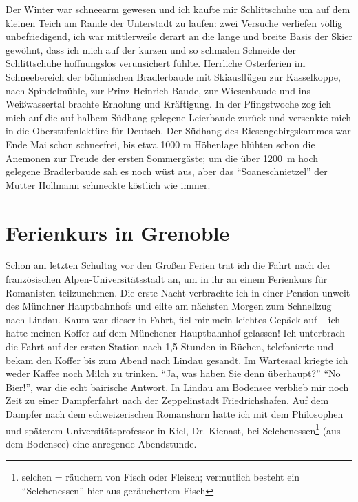 \documentclass[a5paper,pagesize,10pt,twoside=true]{scrbook}
\begin{document}
Der Winter war schneearm gewesen und ich kaufte mir Schlittschuhe um auf dem kleinen Teich am Rande der Unterstadt zu laufen: zwei Versuche verliefen völlig unbefriedigend, ich war mittlerweile derart an die lange und breite Basis der Skier gewöhnt, dass ich mich auf der kurzen und so schmalen Schneide der Schlittschuhe hoffnungslos verunsichert fühlte. Herrliche Osterferien im Schneebereich der böhmischen Bradlerbaude mit Skiausflügen zur Kasselkoppe, nach Spindelmühle, zur Prinz-Heinrich-Baude, zur Wiesenbaude und ins Weißwassertal brachte Erholung und Kräftigung. In der Pfingstwoche zog ich mich auf die auf halbem Südhang gelegene Leierbaude zurück und versenkte mich in die Oberstufenlektüre für Deutsch. Der Südhang des Riesengebirgskammes war Ende Mai schon schneefrei, bis etwa \num{1000} m Höhenlage blühten schon die Anemonen zur Freude der ersten Sommergäste; um die über 1200~m hoch gelegene Bradlerbaude sah es noch wüst aus, aber das \enquote{Soaneschnietzel} der Mutter Hollmann schmeckte köstlich wie immer.

\section{Ferienkurs in Grenoble}
Schon am letzten Schultag vor den Großen Ferien trat ich die Fahrt nach der französischen Alpen-Universitätsstadt an, um in ihr an einem Ferienkurs für Romanisten teilzunehmen. Die erste Nacht verbrachte ich in einer Pension unweit des Münchner Hauptbahnhofs und eilte am nächsten Morgen zum Schnellzug nach Lindau. Kaum war dieser in Fahrt, fiel mir mein leichtes Gepäck auf -- ich hatte meinen Koffer auf dem Münchener Hauptbahnhof gelassen! Ich unterbrach die Fahrt auf der ersten Station nach 1,5 Stunden in Büchen, telefonierte und bekam den Koffer bis zum Abend nach Lindau gesandt. Im Wartesaal kriegte ich weder Kaffee noch Milch zu trinken. \enquote{Ja, was haben Sie denn überhaupt?} \enquote{No Bier!}, war die echt bairische Antwort. In Lindau am Bodensee verblieb mir noch Zeit zu einer Dampferfahrt nach der Zeppelinstadt Friedrichshafen. Auf dem Dampfer nach dem schweizerischen Romanshorn hatte ich mit dem Philosophen und späterem Universitätsprofessor in Kiel, Dr. Kienast, bei Selchenessen\footnote{selchen = räuchern von Fisch oder Fleisch; vermutlich besteht ein \enquote{Selchenessen} hier aus geräuchertem Fisch} (aus dem Bodensee) eine anregende Abendstunde.
\end{document}
